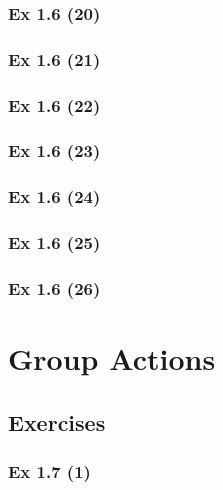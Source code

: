 \subsubsection{Ex 1.6 (20)}\label{sec:Ex_1.6.20}

\newpage		%

\subsubsection{Ex 1.6 (21)}\label{sec:Ex_1.6.21}

\subsubsection{Ex 1.6 (22)}\label{sec:Ex_1.6.22}

\subsubsection{Ex 1.6 (23)}\label{sec:Ex_1.6.23}

\subsubsection{Ex 1.6 (24)}\label{sec:Ex_1.6.24}

\subsubsection{Ex 1.6 (25)}\label{sec:Ex_1.6.25}

\subsubsection{Ex 1.6 (26)}\label{sec:Ex_1.6.26}

\newpage		%

\section{Group Actions}\label{sec:1.7}	
\subsection*{Exercises}\label{sec:1.7_Exercises}

\subsubsection{Ex 1.7 (1)}\label{sec:Ex_1.7.1}

